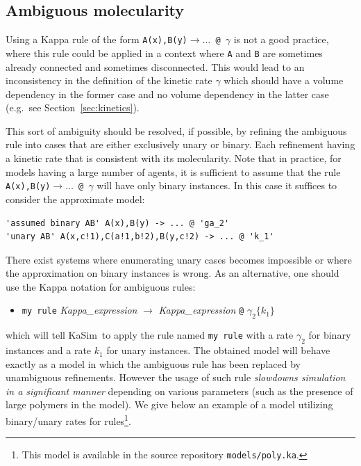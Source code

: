 \documentclass[11pt]{book}
\def\KaSim{\textsf{KaSim}}
\def\ttt#1{\texttt{#1}}
\def\rar{\rightarrow}
\def\ga{\gamma}
\def\eg{e.g.~}
\def\ITE#1{\begin{itemize}#1\end{itemize}}
\begin{document}
\subsection{Ambiguous molecularity}\label{sec:ambiguous}

Using a Kappa rule of the form \ttt{A(x),B(y)$\rar \dots$ @ $\ga$} is not a good practice, where this rule could be applied in a context where \ttt{A} and \ttt{B} are sometimes already connected and sometimes disconnected. This would lead to an inconsistency in the definition of the kinetic rate $\ga$ which should have a volume dependency in the former case and no volume dependency in the latter case ({\eg}see Section~\ref{sec:kinetics}).

This sort of ambiguity should be resolved, if possible, by refining the ambiguous rule into cases that are either exclusively unary or binary. Each refinement having a kinetic rate that is consistent with its molecularity. Note that in practice, for models having a large number of agents, it is sufficient to assume that the rule \ttt{A(x),B(y)$\rar \dots$ @ $\ga$} will have only binary instances. In this case it suffices to consider the approximate model:
\begin{lstlisting}[language=kappa]
'assumed binary AB' A(x),B(y) -> ... @ 'ga_2'
'unary AB' A(x,c!1),C(a!1,b!2),B(y,c!2) -> ... @ 'k_1'
\end{lstlisting}

There exist systems where enumerating unary cases becomes
impossible or where the approximation on binary instances is wrong. As an alternative, one should use the Kappa notation for ambiguous rules:
\ITE{
\item[] \ttt{{\textquotesingle}my rule{\textquotesingle}} {\it Kappa\_expression} $\rar$ {\it Kappa\_expression} \ttt{@} $\ga_2 \{k_1\}$
}
which will tell \KaSim~to apply the rule named  \ttt{{\textquotesingle}my rule{\textquotesingle}} with a rate $\ga_2$ for
binary instances and a rate $k_1$ for unary instances. The obtained
model will behave exactly as a model in which the ambiguous rule has
been replaced by unambiguous refinements. However the usage of such
rule \emph{slowdowns simulation in a significant manner}
depending on various parameters (such as the presence of large
polymers in the model). We give below an example of a model utilizing
binary/unary rates for rules\footnote{This model is available in the
  source repository \ttt{models/poly.ka}.}.


\end{document}
